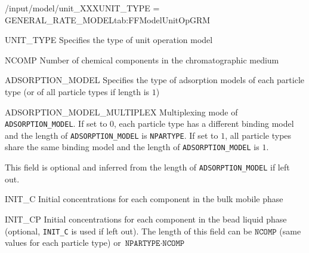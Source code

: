 \begin{condsubgroup}{/input/model/unit\_XXX}{UNIT\_TYPE = GENERAL\_RATE\_MODEL}{tab:FFModelUnitOpGRM}
  \begin{dataset}[type=string,range={\texttt{GENERAL\_RATE\_MODEL}},length=1]{UNIT\_TYPE}
    Specifies the type of unit operation model
  \end{dataset}
  \begin{dataset}[type=int,range={$\geq 1$},length=1]{NCOMP}
    Number of chemical components in the chromatographic medium
  \end{dataset}
  \begin{dataset}[type=string,range={See Section~\ref{sec:FFAdsorption}},length={$1$ / \texttt{NPARTYPE}}]{ADSORPTION\_MODEL}
    Specifies the type of adsorption models of each particle type (or of all particle types if length is $1$)
  \end{dataset}
  \begin{dataset}[unit=--,type=int,range={$\{0, 1\}$},length={1}]{ADSORPTION\_MODEL\_MULTIPLEX}
    Multiplexing mode of \texttt{ADSORPTION\_MODEL}.
    If set to $0$, each particle type has a different binding model and the length of \texttt{ADSORPTION\_MODEL} is \texttt{NPARTYPE}.
    If set to $1$, all particle types share the same binding model and the length of \texttt{ADSORPTION\_MODEL} is $1$.

    This field is optional and inferred from the length of \texttt{ADSORPTION\_MODEL} if left out.
  \end{dataset}
  \begin{dataset}[unit=\si{\mol\per\cubic\metre\of{IV}},type=double,range={$\geq 0$},length={\texttt{NCOMP}}]{INIT\_C}
    Initial concentrations for each component in the bulk mobile phase
  \end{dataset}
  \begin{dataset}[unit=\si{\mol\per\cubic\metre\of{MP}},type=double,range={$\geq 0$},length={\texttt{NCOMP} / $\texttt{NPARTYPE} \cdot \texttt{NCOMP}$}]{INIT\_CP}
    Initial concentrations for each component in the bead liquid phase (optional, \texttt{INIT\_C} is used if left out).
    The length of this field can be $\texttt{NCOMP}$ (same values for each particle type) or $\texttt{NPARTYPE} \cdot \texttt{NCOMP}$


\end{dataset}
\end{condsubgroup}
